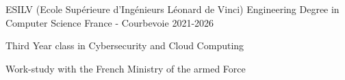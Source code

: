 

\begin{cventries}

	\cventry
	{ESILV (Ecole Supérieure d'Ingénieurs Léonard de Vinci)} %
	{Engineering Degree in Computer Science} %
	{France - Courbevoie} %
	{2021-2026} %
	{
		\begin{cvitems} %
			\item {Third Year class in Cybersecurity and Cloud Computing}
			\item { Work-study with the French Ministry of the armed Force}
		\end{cvitems}
	}
	{}

\end{cventries}
